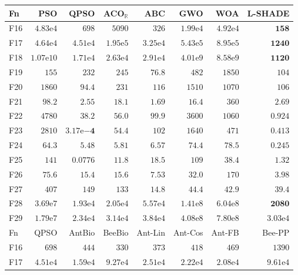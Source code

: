 \begin{tabular}{lrrrrrrr}
\toprule
Fn & PSO & QPSO & ACO$_\mathbb{R}$ & ABC & GWO & WOA & L-SHADE \\
\midrule
F16 & $4.83\mathrm{e}{4}$ & $698$ & $5090$ & $326$ & $1.99\mathrm{e}{4}$ & $4.92\mathrm{e}{4}$ & $\mathbf{158}$ \\
F17 & $4.64\mathrm{e}{4}$ & $4.51\mathrm{e}{4}$ & $1.95\mathrm{e}{5}$ & $3.25\mathrm{e}{4}$ & $5.43\mathrm{e}{5}$ & $8.95\mathrm{e}{5}$ & $\mathbf{1240}$ \\
F18 & $1.07\mathrm{e}{10}$ & $1.71\mathrm{e}{4}$ & $2.63\mathrm{e}{4}$ & $2.91\mathrm{e}{4}$ & $4.01\mathrm{e}{9}$ & $8.58\mathrm{e}{9}$ & $\mathbf{1120}$ \\
F19 & $155$ & $232$ & $245$ & $\mathbf{76.8}$ & $482$ & $1850$ & $104$ \\
F20 & $1860$ & $94.4$ & $231$ & $116$ & $1510$ & $1070$ & $106$ \\
F21 & $98.2$ & $2.55$ & $18.1$ & $\mathbf{1.69}$ & $16.4$ & $360$ & $2.69$ \\
F22 & $4780$ & $38.2$ & $56.0$ & $99.9$ & $3600$ & $1060$ & $\mathbf{0.924}$ \\
F23 & $2810$ & $\mathbf{3.17\mathrm{e}{-4}}$ & $54.4$ & $102$ & $1640$ & $471$ & $0.413$ \\
F24 & $64.3$ & $5.48$ & $5.81$ & $6.57$ & $74.4$ & $78.5$ & $\mathbf{0.245}$ \\
F25 & $141$ & $\mathbf{0.0776}$ & $11.8$ & $18.5$ & $109$ & $38.4$ & $1.32$ \\
F26 & $75.6$ & $15.4$ & $15.6$ & $7.53$ & $32.0$ & $170$ & $\mathbf{3.98}$ \\
F27 & $407$ & $149$ & $133$ & $\mathbf{14.8}$ & $44.4$ & $42.9$ & $39.4$ \\
F28 & $3.69\mathrm{e}{7}$ & $1.93\mathrm{e}{4}$ & $2.05\mathrm{e}{4}$ & $5.57\mathrm{e}{4}$ & $1.41\mathrm{e}{8}$ & $6.04\mathrm{e}{8}$ & $\mathbf{2080}$ \\
F29 & $1.79\mathrm{e}{7}$ & $2.34\mathrm{e}{4}$ & $3.14\mathrm{e}{4}$ & $3.84\mathrm{e}{4}$ & $4.08\mathrm{e}{8}$ & $7.80\mathrm{e}{8}$ & $3.03\mathrm{e}{4}$ \\
\midrule
Fn & QPSO & AntBio & BeeBio & Ant-Lin & Ant-Cos & Ant-FB & Bee-PP \\
\midrule
F16 & $698$ & $444$ & $330$ & $373$ & $418$ & $469$ & $1390$ \\
F17 & $4.51\mathrm{e}{4}$ & $1.59\mathrm{e}{4}$ & $9.27\mathrm{e}{4}$ & $2.51\mathrm{e}{4}$ & $2.22\mathrm{e}{4}$ & $2.08\mathrm{e}{4}$ & $9.61\mathrm{e}{4}$ \\

\end{tabular}
